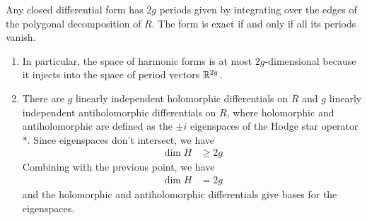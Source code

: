\documentclass[12pt]{article}
\begin{document}
Any closed differential form has $2g$ periods given by integrating over the edges of the polygonal decomposition of $R$. The form is exact if and only if all its periods vanish. 

\begin{enumerate}
    \item In particular, the space of harmonic forms is at most $2g$-dimensional because it injects into the space of period vectors $\mathbb{R}^{2g}$.
    \item There are $g$ linearly independent holomorphic differentials on $R$ and $g$ linearly independent antiholomorphic differentials on $R$, where holomorphic and antiholomorphic are defined as the $\pm i$ eigenspaces of the Hodge star operator $*$. Since eigenspaces don't intersect, we have \begin{align*}
        \dim H & \geq 2g
    \end{align*} Combining with the previous point, we have \begin{align*}
        \dim H & = 2g
    \end{align*} and the holomorphic and antiholomorphic differentials give bases for the eigenspaces.
\end{enumerate}
\end{document}

